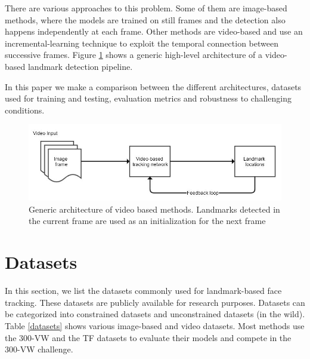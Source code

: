 \documentclass{llncs}
\begin{document}
There are various approaches to this problem. Some of them are image-based methods, where the models are trained on still frames and the detection also happens independently at each frame. Other methods are video-based and use an incremental-learning technique to exploit the temporal connection between successive frames. Figure \ref{generic_video_based} shows a generic high-level architecture of a video-based landmark detection pipeline.

In this paper we make a comparison between the different architectures, datasets used for training and testing, evaluation metrics and robustness to challenging conditions. 

\begin{figure}[h!]
\centering
\includegraphics[scale=0.5]{Media/generic_video_based}
\caption{Generic architecture of video based methods. Landmarks detected in the current frame are used as an initialization for the next frame}
\label{generic_video_based}
\end{figure}

\section{Datasets}

In this section, we list the datasets commonly used for landmark-based face tracking. These datasets are publicly available for research purposes. Datasets can be categorized into constrained datasets and unconstrained datasets (in the wild).
Table \ref{datasets} shows various image-based and video datasets. Most methods use the 300-VW\cite{300-VW} and the TF\cite{tf} datasets to evaluate their models and compete in the 300-VW challenge. 
\end{document}
